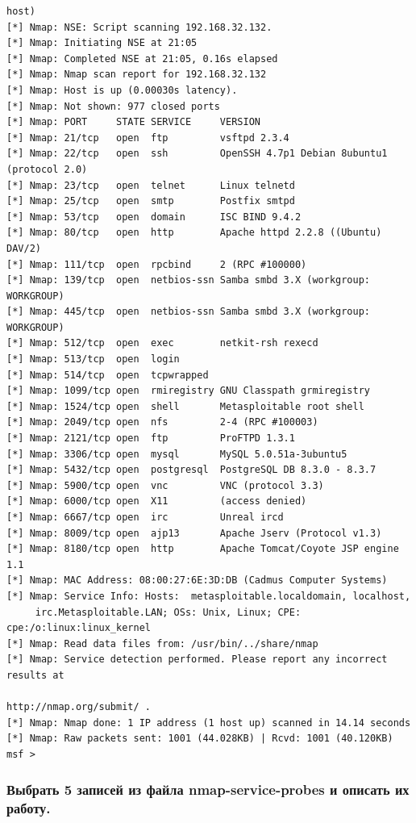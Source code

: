 \documentclass[a4paper, 14pt]{article}				%
\begin{document}
\begin{Verbatim}[frame=single]
                                                                        host)
[*] Nmap: NSE: Script scanning 192.168.32.132.
[*] Nmap: Initiating NSE at 21:05
[*] Nmap: Completed NSE at 21:05, 0.16s elapsed
[*] Nmap: Nmap scan report for 192.168.32.132
[*] Nmap: Host is up (0.00030s latency).
[*] Nmap: Not shown: 977 closed ports
[*] Nmap: PORT     STATE SERVICE     VERSION
[*] Nmap: 21/tcp   open  ftp         vsftpd 2.3.4
[*] Nmap: 22/tcp   open  ssh         OpenSSH 4.7p1 Debian 8ubuntu1 (protocol 2.0)
[*] Nmap: 23/tcp   open  telnet      Linux telnetd
[*] Nmap: 25/tcp   open  smtp        Postfix smtpd
[*] Nmap: 53/tcp   open  domain      ISC BIND 9.4.2
[*] Nmap: 80/tcp   open  http        Apache httpd 2.2.8 ((Ubuntu) DAV/2)
[*] Nmap: 111/tcp  open  rpcbind     2 (RPC #100000)
[*] Nmap: 139/tcp  open  netbios-ssn Samba smbd 3.X (workgroup: WORKGROUP)
[*] Nmap: 445/tcp  open  netbios-ssn Samba smbd 3.X (workgroup: WORKGROUP)
[*] Nmap: 512/tcp  open  exec        netkit-rsh rexecd
[*] Nmap: 513/tcp  open  login
[*] Nmap: 514/tcp  open  tcpwrapped
[*] Nmap: 1099/tcp open  rmiregistry GNU Classpath grmiregistry
[*] Nmap: 1524/tcp open  shell       Metasploitable root shell
[*] Nmap: 2049/tcp open  nfs         2-4 (RPC #100003)
[*] Nmap: 2121/tcp open  ftp         ProFTPD 1.3.1
[*] Nmap: 3306/tcp open  mysql       MySQL 5.0.51a-3ubuntu5
[*] Nmap: 5432/tcp open  postgresql  PostgreSQL DB 8.3.0 - 8.3.7
[*] Nmap: 5900/tcp open  vnc         VNC (protocol 3.3)
[*] Nmap: 6000/tcp open  X11         (access denied)
[*] Nmap: 6667/tcp open  irc         Unreal ircd
[*] Nmap: 8009/tcp open  ajp13       Apache Jserv (Protocol v1.3)
[*] Nmap: 8180/tcp open  http        Apache Tomcat/Coyote JSP engine 1.1
[*] Nmap: MAC Address: 08:00:27:6E:3D:DB (Cadmus Computer Systems)
[*] Nmap: Service Info: Hosts:  metasploitable.localdomain, localhost, 
     irc.Metasploitable.LAN; OSs: Unix, Linux; CPE: cpe:/o:linux:linux_kernel
[*] Nmap: Read data files from: /usr/bin/../share/nmap
[*] Nmap: Service detection performed. Please report any incorrect results at
                                                    http://nmap.org/submit/ .
[*] Nmap: Nmap done: 1 IP address (1 host up) scanned in 14.14 seconds
[*] Nmap: Raw packets sent: 1001 (44.028KB) | Rcvd: 1001 (40.120KB)
msf > 
\end{Verbatim}


\subsubsection{Выбрать 5 записей из файла nmap-service-probes и описать их работу.}
\end{document}
